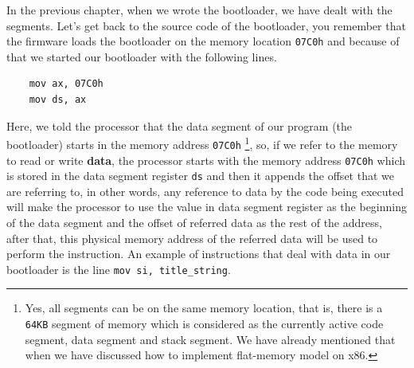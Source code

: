In the previous chapter, when we wrote the bootloader, we have dealt
with the segments. Let's get back to the source code of the bootloader,
you remember that the firmware loads the bootloader on the memory
location \lstinline!07C0h! and because of that we started our bootloader
with the following lines.

\begin{lstlisting}
    mov ax, 07C0h
    mov ds, ax
\end{lstlisting}

Here, we told the processor that the data segment of our program (the
bootloader) starts in the memory address \lstinline!07C0h! \footnote{Yes,
  all segments can be on the same memory location, that is, there is a
  \lstinline!64KB! segment of memory which is considered as the
  currently active code segment, data segment and stack segment. We have
  already mentioned that when we have discussed how to implement
  flat-memory model on x86.}, so, if we refer to the memory to read or
write \textbf{data}, the processor starts with the memory address
\lstinline!07C0h! which is stored in the data segment register
\lstinline!ds! and then it appends the offset that we are referring to,
in other words, any reference to data by the code being executed will
make the processor to use the value in data segment register as the
beginning of the data segment and the offset of referred data as the
rest of the address, after that, this physical memory address of the
referred data will be used to perform the instruction. An example of
instructions that deal with data in our bootloader is the line
\lstinline!mov si, title_string!.

